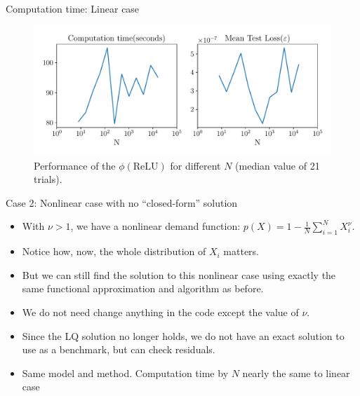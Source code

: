 \documentclass[aspectratio=169,10pt]{beamer}
\begin{document}
			\begin{frame}{Computation time: Linear case}
			
			\begin{figure}[h!]
			\centering
			\includegraphics[width=\linewidth]{./figures/deep-sets-linear-profiling-var-n}
			\caption{Performance of the $\phi(\text{ReLU})$ for different $N$ (median value of 21 trials).}
			\end{figure}	
			
			\end{frame}
				\begin{frame}{Case 2: Nonlinear case with no ``closed-form'' solution}
				
				\begin{itemize}
				
				\item With $\nu>1$, we have a nonlinear demand function:  $p(X) = 1 -  \frac{1}{N}\sum_{i=1}^N X_i^{\nu}$.\vspace{0.1in}
				
				\item Notice how, now, the whole distribution  of $X_i$ matters.\vspace{0.1in}
				
				\item But we can still find the solution to this nonlinear case using exactly the same functional approximation and algorithm as before.\vspace{0.1in}    
				
				\item We do not need change anything in the code except the value of $\nu$.\vspace{0.1in}   
				
				\item Since the LQ solution no longer holds, we do not have an exact solution to use as a benchmark, but can check residuals.\vspace{0.1in}
				
				\item Same model and method.  Computation time by $N$ nearly the same to linear case
			
				\end{itemize}
				
				\end{frame}
	
\end{document}
